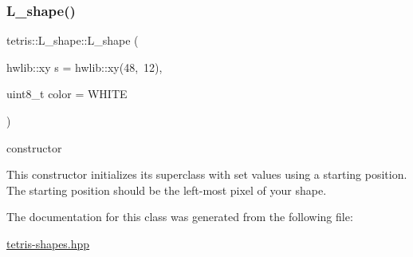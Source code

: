\subsubsection{\texorpdfstring{L\+\_\+shape()}{L\_shape()}}
{\footnotesize\ttfamily tetris\+::\+L\+\_\+shape\+::\+L\+\_\+shape (\begin{DoxyParamCaption}\item[{hwlib\+::xy}]{s = {\ttfamily hwlib\+:\+:xy(48,~12)},  }\item[{uint8\+\_\+t}]{color = {\ttfamily WHITE} }\end{DoxyParamCaption})\hspace{0.3cm}{\ttfamily [inline]}}



constructor 

This constructor initializes its superclass with set values using a starting position. The starting position should be the left-\/most pixel of your shape. 

The documentation for this class was generated from the following file\+:\begin{DoxyCompactItemize}
\item 
\hyperlink{tetris-shapes_8hpp}{tetris-\/shapes.\+hpp}\end{DoxyCompactItemize}
